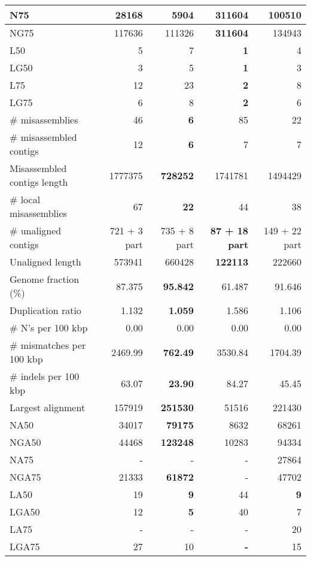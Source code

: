 \documentclass[12pt,a4paper]{article}
\begin{document}
\begin{table}[ht]
\begin{center}
\begin{tabular}{|l*{4}{|r}|}
N75 & 28168 & 5904 & {\bf 311604} & 100510 \\ \hline
NG75 & 117636 & 111326 & {\bf 311604} & 134943 \\ \hline
L50 & 5 & 7 & {\bf 1} & 4 \\ \hline
LG50 & 3 & 5 & {\bf 1} & 3 \\ \hline
L75 & 12 & 23 & {\bf 2} & 8 \\ \hline
LG75 & 6 & 8 & {\bf 2} & 6 \\ \hline
\# misassemblies & 46 & {\bf 6} & 85 & 22 \\ \hline
\# misassembled contigs & 12 & {\bf 6} & 7 & 7 \\ \hline
Misassembled contigs length & 1777375 & {\bf 728252} & 1741781 & 1494429 \\ \hline
\# local misassemblies & 67 & {\bf 22} & 44 & 38 \\ \hline
\# unaligned contigs & 721 + 3 part & 735 + 8 part & {\bf 87 + 18 part} & 149 + 22 part \\ \hline
Unaligned length & 573941 & 660428 & {\bf 122113} & 222660 \\ \hline
Genome fraction (\%) & 87.375 & {\bf 95.842} & 61.487 & 91.646 \\ \hline
Duplication ratio & 1.132 & {\bf 1.059} & 1.586 & 1.106 \\ \hline
\# N's per 100 kbp & 0.00 & 0.00 & 0.00 & 0.00 \\ \hline
\# mismatches per 100 kbp & 2469.99 & {\bf 762.49} & 3530.84 & 1704.39 \\ \hline
\# indels per 100 kbp & 63.07 & {\bf 23.90} & 84.27 & 45.45 \\ \hline
Largest alignment & 157919 & {\bf 251530} & 51516 & 221430 \\ \hline
NA50 & 34017 & {\bf 79175} & 8632 & 68261 \\ \hline
NGA50 & 44468 & {\bf 123248} & 10283 & 94334 \\ \hline
NA75 & - & - & - & 27864 \\ \hline
NGA75 & 21333 & {\bf 61872} & - & 47702 \\ \hline
LA50 & 19 & {\bf 9} & 44 & {\bf 9} \\ \hline
LGA50 & 12 & {\bf 5} & 40 & 7 \\ \hline
LA75 & - & - & - & 20 \\ \hline
LGA75 & 27 & 10 & {\bf -} & 15 \\ \hline
\end{tabular}
\end{center}
\end{table}
\end{document}
